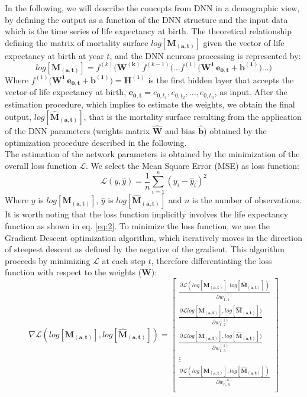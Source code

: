 \documentclass[a4,11pt]{article}
\begin{document}
In the following, we will describe the concepts from DNN in a demographic view, by defining the output as a function of the DNN structure and the input data which is the time series of life expectancy at birth. 
The theoretical relationship defining the matrix of mortality surface $log[\mathbf{M_{(a,t)}}]$ given the vector of life expectancy at birth at year $t$, and the DNN neurons processing is represented by:
\begin{equation}
log[\mathbf{M_{(a,t)}}]=f^{(k)}\big(\mathbf{W^{(k)}}\,    f^{(k-1)} \big(	\dots f^{(1)}\big(\mathbf{W^{1}\,\mathbf{e_{0,t}}}+\mathbf{b^{(1)}}\big)\dots\big)
\label{eq:2}
\end {equation}
Where $f^{(1)}\big(\mathbf{W^{1}\,\mathbf{e_{0,t}}}+\mathbf{b^{(1)}}\big) = \mathbf{H^{(1)}}$ is the first hidden layer that accepts the vector of life expectancy at birth, $\mathbf{e_{0,t}}=e_{0,t_1},e_{0,t_2},...,e_{0,t_n}$, as input.
After the estimation procedure, which implies to estimate the weights, we obtain the final output, $log[\mathbf{\hat{M}_{(a,t)}}]$, that is the mortality surface resulting from the application of the DNN parameters (weights matrix $\mathbf{\hat{W}}$ and bias $\mathbf{\hat{b}}$) obtained by the optimization procedure described in the following.\\
The estimation of the network parameters is obtained by the minimization of the overall loss function $\mathcal{L}$. We select the Mean Square Error (MSE) as loss function:
$$\mathcal{L}(y,\hat{y}) = \frac{1}{n}\sum_{i=1}^{n}\left(y_i-\hat{y}_i\right)^2$$
Where $y$ is $log[\mathbf{M_{(a,t)}}]$, $\hat{y}$ is $log[\mathbf{\hat{M}_{(a,t)}}]$ and $n$ is the number of observations.
It is worth noting that the loss function implicitly involves the life expectancy function as shown in eq. \ref{eq:2}. 
To minimize the loss function, we use the Gradient Descent optimization algorithm, which iteratively moves in the direction of steepest descent as defined by the negative of the gradient.
This algorithm proceeds by minimizing $\mathcal{L}$ at each step $t$,  therefore differentiating the loss function with respect to the weights  ($\mathbf{{W}}$):
\begin{equation}
\nabla \mathcal{L}(log[\mathbf{M_{(a,t)}}],log[\mathbf{\hat{M}_{(a,t)}}])=
\begin{bmatrix}
\frac{\partial \mathcal{L}(log[\mathbf{M_{(a,t)}}],log[\mathbf{\hat{M}_{(a,t)}}])}{\partial w_{1,1}^{(1)}}\\
\frac{\partial \mathcal{L}log[\mathbf{M_{(a,t)}}],log[\mathbf{\hat{M}_{(a,t)}}])}{\partial w_{1,2}^{(1)}}\\
\frac{\partial \mathcal{L}log[\mathbf{M_{(a,t)}}],log[\mathbf{\hat{M}_{(a,t)}}])}{\partial w_{1,3}^{(1)}}\\
\vdots \\
\frac{\partial \mathcal{L}(log[\mathbf{M_{(a,t)}}],log[\mathbf{\hat{M}_{(a,t)}}])}{\partial w_{n,n}^{(k)}}\\
\end{bmatrix}
\end{equation}
\end{document}

